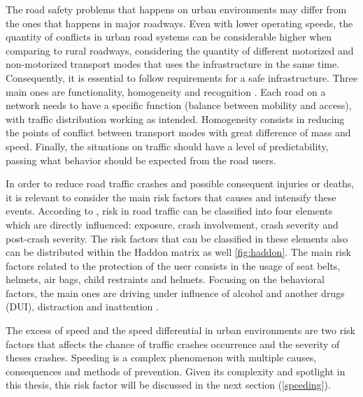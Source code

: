 
The road safety problems that happens on urban environments may differ from the ones that happens in major roadways. Even with lower operating speeds, the quantity of conflicts in urban road systems can be considerable higher when comparing to rural roadways, considering the quantity of different motorized and non-motorized transport modes that uses the infrastructure in the same time. Consequently, it is essential to follow requirements for a safe infrastructure. Three main ones are functionality, homogeneity and recognition \cite{SWOV2003}. Each road on a network needs to have a specific function (balance between mobility and access), with traffic distribution working as intended. Homogeneity consists in reducing the points of conflict between transport modes with great difference of mass and speed. Finally, the situations on traffic should have a level of predictability, passing what behavior should be expected from the road users.


In order to reduce road traffic crashes and possible consequent injuries or deaths, it is relevant to consider the main risk factors that causes and intensify these events. According to \textcite{WHO2004}, risk in road traffic can be classified into four elements which are directly influenced: exposure, crash involvement, crash severity and post-crash severity. The risk factors that can be classified in these elements also can be distributed within the Haddon matrix as well \autoref{fig:haddon}. The main risk factors related to the protection of the user consists in the usage of seat belts, helmets, air bags, child restraints and helmets. Focusing on the behavioral factors, the main ones are driving under influence of alcohol and another drugs (DUI), distraction and inattention \cite{Shinar2007}.


The excess of speed and the speed differential in urban environments are two risk factors that affects the chance of traffic crashes occurrence and the severity of theses crashes. Speeding is a complex phenomenon with multiple causes, consequences and methods of prevention. Given its complexity and spotlight in this thesis, this risk factor will be discussed in the next section (\ref{speeding}). 

